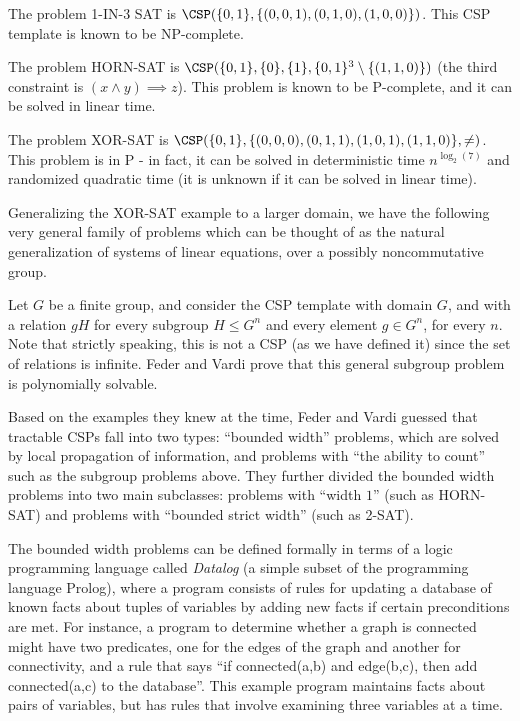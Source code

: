 \begin{ex} The problem 1-IN-3 SAT is $\CSP(\{0,1\}, \{(0,0,1), (0,1,0), (1,0,0)\})$. This CSP template is known to be NP-complete.
\end{ex}

\begin{ex} The problem HORN-SAT is $\CSP(\{0,1\}, \{0\}, \{1\}, \{0,1\}^3\setminus\{(1,1,0)\})$ (the third constraint is $(x \wedge y) \implies z$). This problem is known to be P-complete, and it can be solved in linear time.
\end{ex}

\begin{ex} The problem XOR-SAT is $\CSP(\{0,1\}, \{(0,0,0), (0,1,1), (1,0,1), (1,1,0)\}, \ne)$. This problem is in P - in fact, it can be solved in deterministic time $n^{\log_2(7)}$ and randomized quadratic time \cite{sparse-systems} (it is unknown if it can be solved in linear time).
\end{ex}

Generalizing the XOR-SAT example to a larger domain, we have the following very general family of problems which can be thought of as the natural generalization of systems of linear equations, over a possibly noncommutative group.

\begin{ex} Let $G$ be a finite group, and consider the CSP template with domain $G$, and with a relation $gH$ for every subgroup $H \leq G^n$ and every element $g \in G^n$, for every $n$. Note that strictly speaking, this is not a CSP (as we have defined it) since the set of relations is infinite. Feder and Vardi \cite{feder-vardi} prove that this general subgroup problem is polynomially solvable.
\end{ex}

Based on the examples they knew at the time, Feder and Vardi guessed that tractable CSPs fall into two types: ``bounded width'' problems, which are solved by local propagation of information, and problems with ``the ability to count'' such as the subgroup problems above. They further divided the bounded width problems into two main subclasses: problems with ``width $1$'' (such as HORN-SAT) and problems with ``bounded strict width'' (such as 2-SAT).

The bounded width problems can be defined formally in terms of a logic programming language called \emph{Datalog} (a simple subset of the programming language Prolog), where a program consists of rules for updating a database of known facts about tuples of variables by adding new facts if certain preconditions are met. For instance, a program to determine whether a graph is connected might have two predicates, one for the edges of the graph and another for connectivity, and a rule that says ``if connected(a,b) and edge(b,c), then add connected(a,c) to the database''. This example program maintains facts about pairs of variables, but has rules that involve examining three variables at a time.

